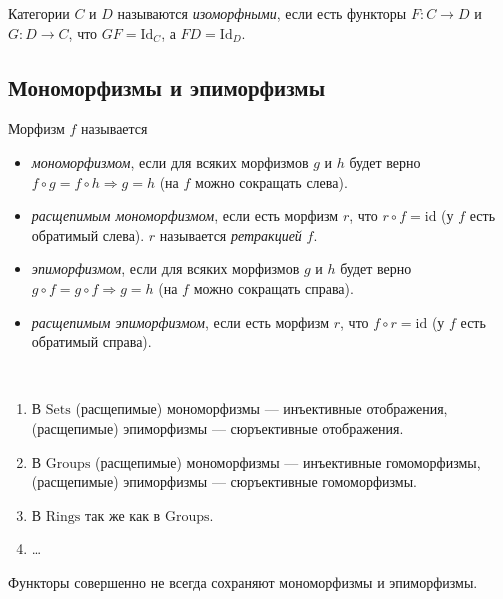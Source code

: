 \documentclass[12pt,a4paper]{article}
\newcommand{\Id}{\mathrm{Id}}
\newcommand{\id}{\mathrm{id}}
\newcommand{\Sets}{\mathrm{Sets}}
\newcommand{\Groups}{\mathrm{Groups}}
\newcommand{\Rings}{\mathrm{Rings}}
\begin{document}
    \begin{definition}
        Категории $C$ и $D$ называются \emph{изоморфными}, если есть функторы $F: C \to D$ и $G: D \to C$, что $GF = \Id_C$, а $FD = \Id_D$.
    \end{definition}

    \subsection{Мономорфизмы и эпиморфизмы}

    \begin{definition}
        Морфизм $f$ называется
        \begin{itemize}
            \item \emph{мономорфизмом}, если для всяких морфизмов $g$ и $h$ будет верно $f \circ g = f \circ h \Rightarrow g = h$ (на $f$ можно сокращать слева).
            \item \emph{расщепимым мономорфизмом}, если есть морфизм $r$, что $r \circ f = \id$ (у $f$ есть обратимый слева). $r$ называется \emph{ретракцией} $f$.
            \item \emph{эпиморфизмом}, если для всяких морфизмов $g$ и $h$ будет верно $g \circ f = g \circ f \Rightarrow g = h$ (на $f$ можно сокращать справа).
            \item \emph{расщепимым эпиморфизмом}, если есть морфизм $r$, что $f \circ r = \id$ (у $f$ есть обратимый справа).
        \end{itemize}
    \end{definition}

    \begin{example}\ 
        \begin{enumerate}
            \item В $\Sets$ (расщепимые) мономорфизмы --- инъективные отображения, (расщепимые) эпиморфизмы --- сюръективные отображения.
            \item В $\Groups$ (расщепимые) мономорфизмы --- инъективные гомоморфизмы, (расщепимые) эпиморфизмы --- сюръективные гомоморфизмы.
            \item В $\Rings$ так же как в $\Groups$.
            \item \dots
        \end{enumerate}
    \end{example}

    \begin{remark*}
        Функторы совершенно не всегда сохраняют мономорфизмы и эпиморфизмы.
    \end{remark*}
\end{document}
